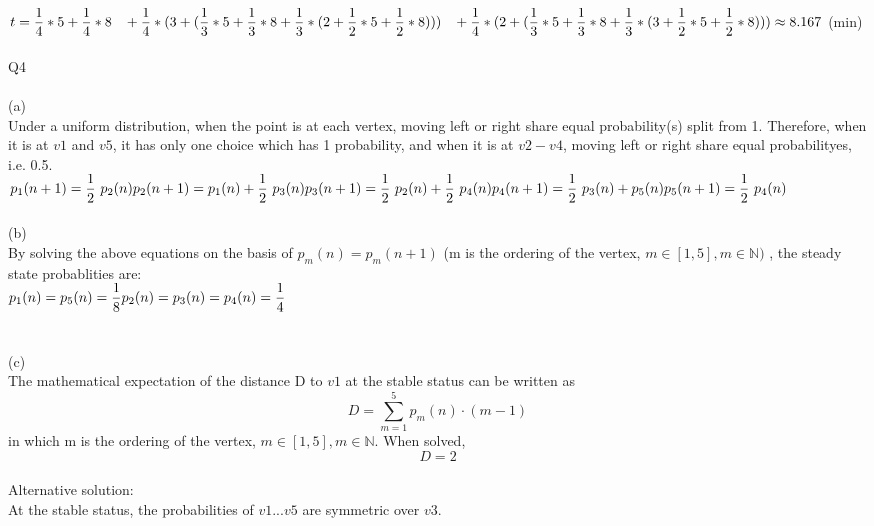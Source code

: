 \documentclass[a4paper]{article}
\begin{document}
$t = \dfrac{1}{4} * 5 +  \dfrac{1}{4} * 8\\ 
\hspace*{0.3cm} +  \dfrac{1}{4} * (3 + ( \dfrac{1}{3} * 5 +  \dfrac{1}{3} * 8 +  \dfrac{1}{3} * (2 +  \dfrac{1}{2} * 5 + \dfrac{1}{2} * 8)))\\
\hspace*{0.3cm} +  \dfrac{1}{4} * (2 + ( \dfrac{1}{3} * 5 +  \dfrac{1}{3} * 8 +  \dfrac{1}{3} * (3 + \dfrac{1}{2} * 5 + \dfrac{1}{2} * 8)))\\
\approx 8.167$ (min)\\
 \\Q4\\
\\(a)\\
Under a uniform distribution, when the point is at each vertex, moving left or right share equal probability(s) split from 1. Therefore, when it is at $v1$ and $v5$, it has only one choice which has 1 probability, and when it is at $v2-v4$, moving left or right share equal probabilityes, i.e. 0.5.\\  
$p_{1}(n+1) = \dfrac{1}{2}\ p_{2}(n)\\
p_{2}(n+1) = p_{1}(n) + \dfrac{1}{2}\ p_{3}(n)\\
p_{3}(n+1) = \dfrac{1}{2}\ p_{2}(n) + \dfrac{1}{2}\ p_{4}(n)\\
p_{4}(n+1) = \dfrac{1}{2}\ p_{3}(n) + p_{5}(n)\\
p_{5}(n+1) = \dfrac{1}{2}\ p_{4}(n)$\\
\\(b)\\
By solving the above equations on the basis of $p_{m}(n)=p_{m}(n+1)$ (m is the ordering of the vertex, $m \in [1,5], m \in \mathbb{N}) $ , the steady state probablities are:\\
$p_{1}(n) = p_{5}(n) = \dfrac{1}{8}\\\\
p_{2}(n) = p_{3}(n) = p_{4}(n) = \dfrac{1}{4}$\\\\
\\(c)\\
The mathematical expectation of the distance D to $v1$ at the stable status can be written as $$D = \sum_{m=1}^{5} p_{m}(n)\cdot (m-1)$$ in which m is the ordering of the vertex, $m \in [1,5], m \in \mathbb{N} $. When solved,\\
$$D = 2$$\\
Alternative solution: \\
At the stable status, the probabilities of $v1 ... v5$ are symmetric over $v3$.\\
\end{document}
